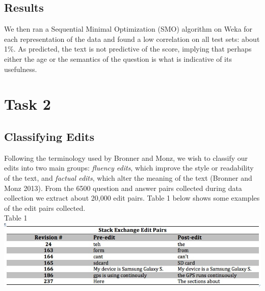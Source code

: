 \documentclass[11pt, oneside]{article}   	%
\begin{document}
\subsection{Results}
We then ran a Sequential Minimal Optimization (SMO) algorithm on Weka for each representation of the data and found a low correlation on all test sets: about 1\%. As predicted, the text is not predictive of the score, implying that perhaps either the age or the semantics of the question is what is indicative of its usefulness. 

\section{Task 2}
\subsection{Classifying Edits} 
Following the terminology used by Bronner and Monz, we wish to classify our edits into two main groups:{ \itshape fluency edits}, which improve the style or readability of the text, and {\itshape factual edits}, which alter the meaning of the text (Bronner and Monz 2013).   From the 6500 question and answer pairs collected during data collection we extract about 20,000 edit pairs.  Table 1 below shows some examples of the edit pairs collected. 
\\[.5cm]
\centering 
Table 1
\includegraphics[width=\textwidth]{table1-editpairs}


\raggedright
\end{document}
